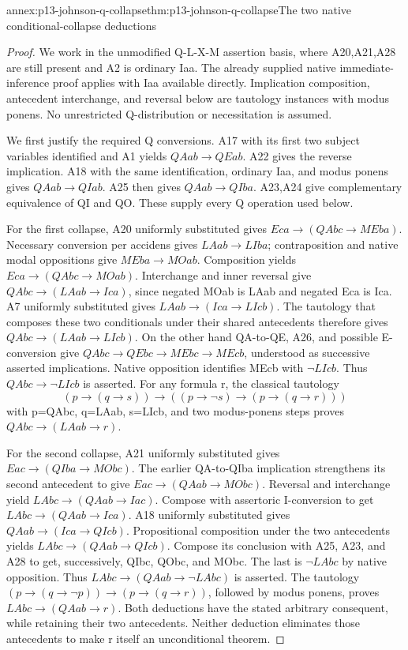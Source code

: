 \begin{annexitem}{annex:p13-johnson-q-collapse}{thm:p13-johnson-q-collapse}{The two native conditional-collapse deductions}
\begin{proof}
We work in the unmodified Q-L-X-M assertion basis, where A20,A21,A28
are still present and A2 is ordinary Iaa. The already supplied native
immediate-inference proof applies with Iaa available directly.
Implication composition, antecedent interchange, and reversal below
are tautology instances with modus ponens. No unrestricted Q-distribution
or necessitation is assumed.

We first justify the required Q conversions. A17 with its first two
subject variables identified and A1 yields \(QAab\to QEab\).
A22 gives the reverse implication. A18 with the same identification,
ordinary Iaa, and modus ponens gives \(QAab\to QIab\).
A25 then gives \(QAab\to QIba\). A23,A24 give complementary
equivalence of QI and QO. These supply every Q operation used below.

For the first collapse, A20 uniformly substituted gives
\(Eca\to(QAbc\to MEba)\). Necessary conversion per accidens gives
\(LAab\to LIba\); contraposition and native modal oppositions give
\(MEba\to MOab\). Composition yields
\(Eca\to(QAbc\to MOab)\). Interchange and inner reversal give
\(QAbc\to(LAab\to Ica)\), since negated MOab is LAab and
negated Eca is Ica. A7 uniformly substituted gives
\(LAab\to(Ica\to LIcb)\). The tautology that composes these
two conditionals under their shared antecedents therefore gives
\(QAbc\to(LAab\to LIcb)\).
On the other hand QA-to-QE, A26, and possible E-conversion give
\(QAbc\to QEbc\to MEbc\to MEcb\), understood as successive
asserted implications. Native opposition identifies MEcb with
\(\neg LIcb\). Thus \(QAbc\to\neg LIcb\) is asserted.
For any formula r, the classical tautology
\[
 (p\to(q\to s))\to((p\to\neg s)\to(p\to(q\to r)))
\]
with p=QAbc, q=LAab, s=LIcb, and two modus-ponens steps proves
\(QAbc\to(LAab\to r)\).

For the second collapse, A21 uniformly substituted gives
\(Eac\to(QIba\to MObc)\). The earlier QA-to-QIba implication
strengthens its second antecedent to give
\(Eac\to(QAab\to MObc)\). Reversal and interchange yield
\(LAbc\to(QAab\to Iac)\). Compose with assertoric I-conversion
to get \(LAbc\to(QAab\to Ica)\).
A18 uniformly substituted gives \(QAab\to(Ica\to QIcb)\).
Propositional composition under the two antecedents yields
\(LAbc\to(QAab\to QIcb)\). Compose its conclusion with A25,
A23, and A28 to get, successively, QIbc, QObc, and MObc.
The last is \(\neg LAbc\) by native opposition.
Thus \(LAbc\to(QAab\to\neg LAbc)\) is asserted.
The tautology
\((p\to(q\to\neg p))\to(p\to(q\to r))\), followed by
modus ponens, proves \(LAbc\to(QAab\to r)\).
Both deductions have the stated arbitrary consequent, while retaining
their two antecedents. Neither deduction eliminates those antecedents
to make r itself an unconditional theorem.
\end{proof}
\end{annexitem}

